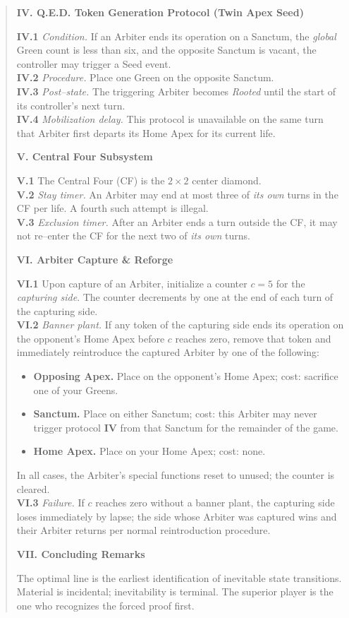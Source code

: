 \documentclass[11pt]{article}
\begin{document}
\begin{quote}
\medskip
\textbf{IV. Q.E.D. Token Generation Protocol (Twin Apex Seed)}

\textbf{IV.1} \textit{Condition.} If an Arbiter ends its operation on a Sanctum, the \emph{global} Green count is less than six, and the opposite Sanctum is vacant, the controller may trigger a Seed event.\\
\textbf{IV.2} \textit{Procedure.} Place one Green on the opposite Sanctum.\\
\textbf{IV.3} \textit{Post--state.} The triggering Arbiter becomes \emph{Rooted} until the start of its controller's next turn.\\
\textbf{IV.4} \textit{Mobilization delay.} This protocol is unavailable on the same turn that Arbiter first departs its Home Apex for its current life.

\medskip
\textbf{V. Central Four Subsystem}

\textbf{V.1} The Central Four (CF) is the $2\times2$ center diamond.\\
\textbf{V.2} \textit{Stay timer.} An Arbiter may end at most three of \emph{its own} turns in the CF per life. A fourth such attempt is illegal.\\
\textbf{V.3} \textit{Exclusion timer.} After an Arbiter ends a turn outside the CF, it may not re--enter the CF for the next two of \emph{its own} turns.

\medskip
\textbf{VI. Arbiter Capture \& Reforge}

\textbf{VI.1} Upon capture of an Arbiter, initialize a counter $c=5$ for the \emph{capturing side}. The counter decrements by one at the end of each turn of the capturing side.\\
\textbf{VI.2} \textit{Banner plant.} If any token of the capturing side ends its operation on the opponent's Home Apex before $c$ reaches zero, remove that token and immediately reintroduce the captured Arbiter by one of the following:
\begin{itemize}\itemsep0.2em
  \item \textbf{Opposing Apex.} Place on the opponent's Home Apex; cost: sacrifice one of your Greens.
  \item \textbf{Sanctum.} Place on either Sanctum; cost: this Arbiter may never trigger protocol \textbf{IV} from that Sanctum for the remainder of the game.
  \item \textbf{Home Apex.} Place on your Home Apex; cost: none.
\end{itemize}
In all cases, the Arbiter's special functions reset to unused; the counter is cleared.\\
\textbf{VI.3} \textit{Failure.} If $c$ reaches zero without a banner plant, the capturing side loses immediately by lapse; the side whose Arbiter was captured wins and their Arbiter returns per normal reintroduction procedure.

\medskip
\textbf{VII. Concluding Remarks}

The optimal line is the earliest identification of inevitable state transitions. Material is incidental; inevitability is terminal. The superior player is the one who recognizes the forced proof first.
\end{quote}
\end{document}
